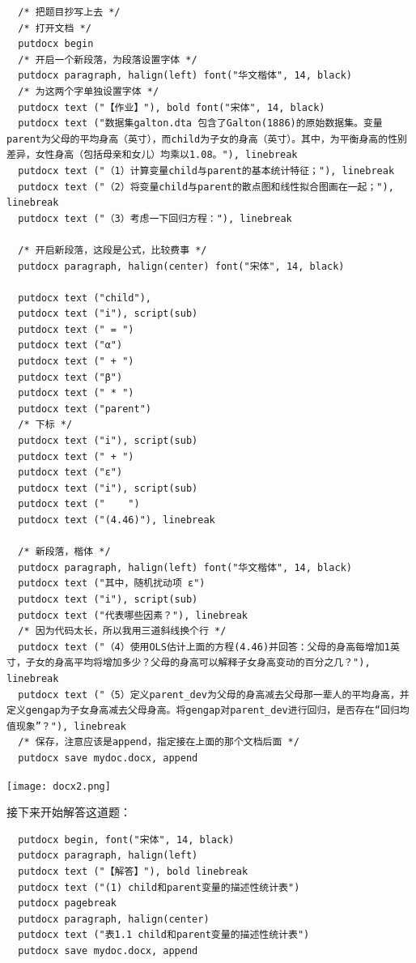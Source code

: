 \documentclass[cn,fancy,blue,11pt]{elegantbook}
\begin{document}
\begin{lstlisting}
  /* 把题目抄写上去 */
  /* 打开文档 */
  putdocx begin
  /* 开启一个新段落，为段落设置字体 */
  putdocx paragraph, halign(left) font("华文楷体", 14, black)
  /* 为这两个字单独设置字体 */
  putdocx text ("【作业】"), bold font("宋体", 14, black)
  putdocx text ("数据集galton.dta 包含了Galton(1886)的原始数据集。变量parent为父母的平均身高（英寸），而child为子女的身高（英寸）。其中，为平衡身高的性别差异，女性身高（包括母亲和女儿）均乘以1.08。"), linebreak
  putdocx text ("（1）计算变量child与parent的基本统计特征；"), linebreak
  putdocx text ("（2）将变量child与parent的散点图和线性拟合图画在一起；"), linebreak
  putdocx text ("（3）考虑一下回归方程："), linebreak

  /* 开启新段落，这段是公式，比较费事 */
  putdocx paragraph, halign(center) font("宋体", 14, black)

  putdocx text ("child"),
  putdocx text ("i"), script(sub)
  putdocx text (" = ")
  putdocx text ("α")
  putdocx text (" + ")
  putdocx text ("β")
  putdocx text (" * ")
  putdocx text ("parent")
  /* 下标 */
  putdocx text ("i"), script(sub)
  putdocx text (" + ")
  putdocx text ("ε")
  putdocx text ("i"), script(sub)
  putdocx text ("    ")
  putdocx text ("(4.46)"), linebreak

  /* 新段落，楷体 */
  putdocx paragraph, halign(left) font("华文楷体", 14, black)
  putdocx text ("其中，随机扰动项 ε")
  putdocx text ("i"), script(sub)
  putdocx text ("代表哪些因素？"), linebreak
  /* 因为代码太长，所以我用三道斜线换个行 */
  putdocx text ("（4）使用OLS估计上面的方程(4.46)并回答：父母的身高每增加1英寸，子女的身高平均将增加多少？父母的身高可以解释子女身高变动的百分之几？"), linebreak
  putdocx text ("（5）定义parent_dev为父母的身高减去父母那一辈人的平均身高，并定义gengap为子女身高减去父母身高。将gengap对parent_dev进行回归，是否存在“回归均值现象”？"), linebreak
  /* 保存，注意应该是append，指定接在上面的那个文档后面 */
  putdocx save mydoc.docx, append
\end{lstlisting}

\noindent\texttt{[image: docx2.png]}

接下来开始解答这道题：

\begin{lstlisting}
  putdocx begin, font("宋体", 14, black)
  putdocx paragraph, halign(left)
  putdocx text ("【解答】"), bold linebreak
  putdocx text ("(1) child和parent变量的描述性统计表")
  putdocx pagebreak
  putdocx paragraph, halign(center)
  putdocx text ("表1.1 child和parent变量的描述性统计表")
  putdocx save mydoc.docx, append
\end{lstlisting}
\end{document}
